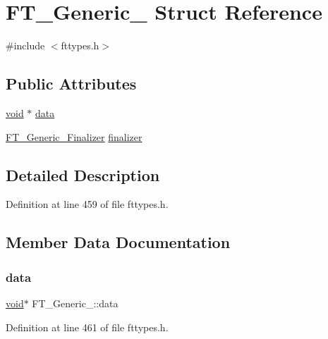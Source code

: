 \hypertarget{struct_f_t___generic__}{}\section{F\+T\+\_\+\+Generic\+\_\+ Struct Reference}
\label{struct_f_t___generic__}


{\ttfamily \#include $<$fttypes.\+h$>$}

\subsection*{Public Attributes}
\begin{DoxyCompactItemize}
\item 
\mbox{\hyperlink{_s_d_l__opengles2__gl2ext_8h_ae5d8fa23ad07c48bb609509eae494c95}{void}} $\ast$ \mbox{\hyperlink{struct_f_t___generic___af0bf8b983254b662f293e9a20505e27e}{data}}
\item 
\mbox{\hyperlink{fttypes_8h_a9f7f3174a89e80b1d9eff58620121b3f}{F\+T\+\_\+\+Generic\+\_\+\+Finalizer}} \mbox{\hyperlink{struct_f_t___generic___a20fce8de90cc9e3876935817247b9ccc}{finalizer}}
\end{DoxyCompactItemize}


\subsection{Detailed Description}


Definition at line 459 of file fttypes.\+h.



\subsection{Member Data Documentation}
\mbox{\label{struct_f_t___generic___af0bf8b983254b662f293e9a20505e27e}} 
\subsubsection{\texorpdfstring{data}{data}}
{\footnotesize\ttfamily \mbox{\hyperlink{_s_d_l__opengles2__gl2ext_8h_ae5d8fa23ad07c48bb609509eae494c95}{void}}$\ast$ F\+T\+\_\+\+Generic\+\_\+\+::data}



Definition at line 461 of file fttypes.\+h.

\mbox{\label{struct_f_t___generic___a20fce8de90cc9e3876935817247b9ccc}} 
